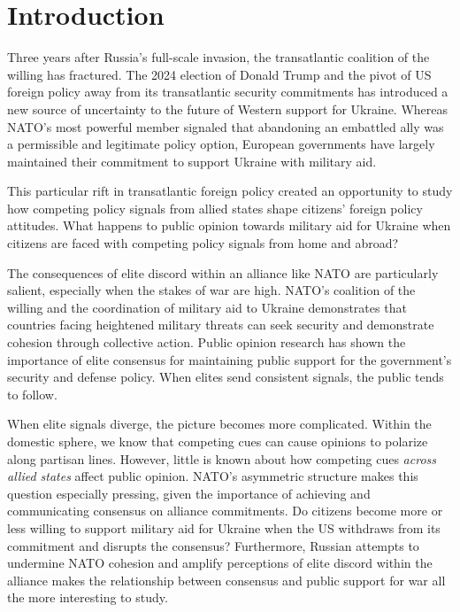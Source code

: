 \section{Introduction}
Three years after Russia's full-scale invasion, the transatlantic coalition of the willing has fractured. The 2024 election of Donald Trump and the pivot of US foreign policy away from its transatlantic security commitments has introduced a new source of uncertainty to the future of Western support for Ukraine. Whereas NATO's most powerful member signaled that abandoning an embattled ally was a permissible and legitimate policy option, European governments have largely maintained their commitment to support Ukraine with military aid. 

This particular rift in transatlantic foreign policy created an opportunity to study how competing policy signals from allied states shape citizens' foreign policy attitudes. What happens to public opinion towards military aid for Ukraine when citizens are faced with competing policy signals from home and abroad? 

The consequences of elite discord within an alliance like NATO are particularly salient, especially when the stakes of war are high. NATO's coalition of the willing and the coordination of military aid to Ukraine demonstrates that countries facing heightened military threats can seek security and demonstrate cohesion through collective action. Public opinion research has shown the importance of elite consensus for maintaining public support for the government's security and defense policy. \autocite{berinsky_assuming_2007, groeling_crossing_2008, baum_relationships_2008, baum_shot_2009} When elites send consistent signals, the public tends to follow.\autocite{mueller_war_1973} 

When elite signals diverge, the picture becomes more complicated. Within the domestic sphere, we know that competing cues can cause opinions to polarize along partisan lines. \autocite{berinsky_assuming_2007, druckman_how_2013} However, little is known about how competing cues \emph{across allied states} affect public opinion. NATO's asymmetric structure makes this question especially pressing, given the importance of achieving and communicating consensus on alliance commitments. Do citizens become more or less willing to support military aid for Ukraine when the US withdraws from its commitment and disrupts the consensus? Furthermore, Russian attempts to undermine NATO cohesion and amplify perceptions of elite discord within the alliance makes the relationship between consensus and public support for war all the more interesting to study. 

